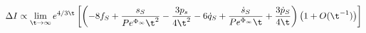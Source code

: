 \begin{equation}
\Delta I \propto \lim_{\t \to \infty}  e^{4/3 \t} \left[\left(-8 f_S +
\frac{s_S}{ P e^{\Phi_{\infty}} \t^2} - \frac{3 p_s}{4 \t^2}-6 \dot{q}_S+\frac{\dot{s}_S}{P e^{\Phi_{\infty}} \t } +\frac{3 \dot{p}_S}{4 \t}\right)\left(1+O(\t^{-1})\right)\right]
\end{equation}

